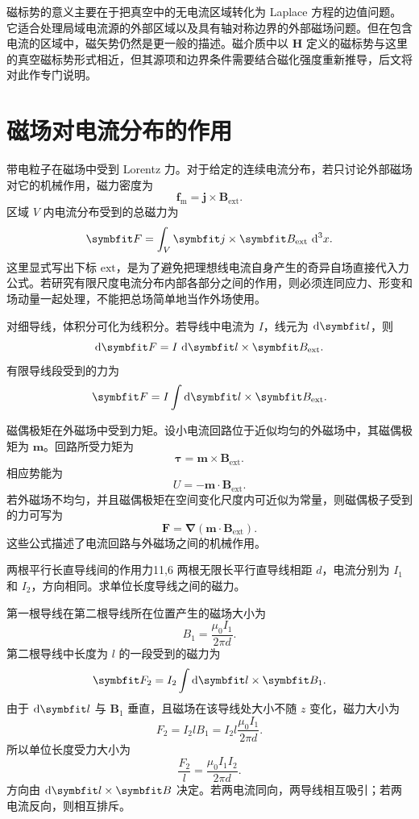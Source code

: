 磁标势的意义主要在于把真空中的无电流区域转化为 Laplace 方程的边值问题。它适合处理局域电流源的外部区域以及具有轴对称边界的外部磁场问题。但在包含电流的区域中，磁矢势仍然是更一般的描述。磁介质中以 $\bm{H}$ 定义的磁标势与这里的真空磁标势形式相近，但其源项和边界条件需要结合磁化强度重新推导，后文将对此作专门说明。

\section{磁场对电流分布的作用}

带电粒子在磁场中受到 Lorentz 力。对于给定的连续电流分布，若只讨论外部磁场对它的机械作用，磁力密度为
\begin{equation}
	\bm{f}_{\mathrm{m}}
	=
	\bm{j}\times\bm{B}_{\mathrm{ext}}.
	\label{eq:11:magnetic-force-density}
\end{equation}
区域 $V$ 内电流分布受到的总磁力为
\[
\bm{F}
=
\int_{V}
\bm{j}\times\bm{B}_{\mathrm{ext}}
\,\dif^{3}x.
\]
这里显式写出下标 $\mathrm{ext}$，是为了避免把理想线电流自身产生的奇异自场直接代入力公式。若研究有限尺度电流分布内部各部分之间的作用，则必须连同应力、形变和场动量一起处理，不能把总场简单地当作外场使用。

对细导线，体积分可化为线积分。若导线中电流为 $I$，线元为 $\dif\bm{l}$，则
\begin{equation}
	\dif\bm{F}
	=
	I\,\dif\bm{l}\times\bm{B}_{\mathrm{ext}}.
	\label{eq:11:line-current-force}
\end{equation}
有限导线段受到的力为
\[
\bm{F}
=
I\int
\dif\bm{l}\times\bm{B}_{\mathrm{ext}}.
\]

磁偶极矩在外磁场中受到力矩。设小电流回路位于近似均匀的外磁场中，其磁偶极矩为 $\bm{m}$。回路所受力矩为
\begin{equation}
	\bm{\tau}
	=
	\bm{m}\times\bm{B}_{\mathrm{ext}}.
	\label{eq:11:magnetic-dipole-torque}
\end{equation}
相应势能为
\begin{equation}
	U
	=
	-\bm{m}\cdot\bm{B}_{\mathrm{ext}}.
	\label{eq:11:magnetic-dipole-energy}
\end{equation}
若外磁场不均匀，并且磁偶极矩在空间变化尺度内可近似为常量，则磁偶极子受到的力可写为
\[
\bm{F}
=
\bm{\nabla}(\bm{m}\cdot\bm{B}_{\mathrm{ext}}).
\]
这些公式描述了电流回路与外磁场之间的机械作用。

\begin{example}{两根平行长直导线间的作用力}{11,6}
	两根无限长平行直导线相距 $d$，电流分别为 $I_{1}$ 和 $I_{2}$，方向相同。求单位长度导线之间的磁力。
	
	\begin{solution}
		第一根导线在第二根导线所在位置产生的磁场大小为
		\[
		B_{1}
		=
		\frac{\mu_{0}I_{1}}{2\pi d}.
		\]
		第二根导线中长度为 $l$ 的一段受到的磁力为
		\[
		\bm{F}_{2}
		=
		I_{2}\int \dif\bm{l}\times\bm{B}_{1}.
		\]
		由于 $\dif\bm{l}$ 与 $\bm{B}_{1}$ 垂直，且磁场在该导线处大小不随 $z$ 变化，磁力大小为
		\[
		F_{2}
		=
		I_{2}lB_{1}
		=
		I_{2}l\frac{\mu_{0}I_{1}}{2\pi d}.
		\]
		所以单位长度受力大小为
		\[
		\frac{F_{2}}{l}
		=
		\frac{\mu_{0}I_{1}I_{2}}{2\pi d}.
		\]
		方向由 $\dif\bm{l}\times\bm{B}$ 决定。若两电流同向，两导线相互吸引；若两电流反向，则相互排斥。
	\end{solution}
\end{example}


